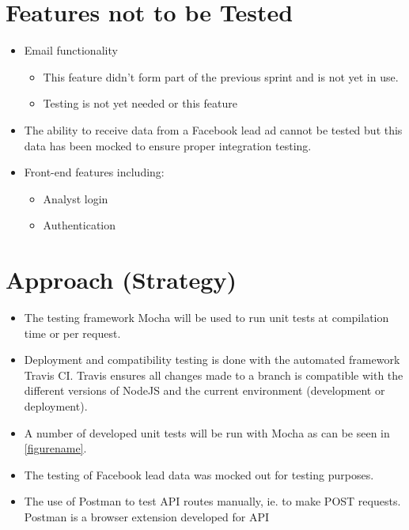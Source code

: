 \documentclass{article}
\begin{document}
\section{Features not to be Tested}
\begin{itemize}
	\item Email functionality
	\begin{itemize}
		\item This feature didn't form part of the previous sprint and is not yet in use.
		\item Testing is not yet needed or this feature
	\end{itemize}
	\item The ability to receive data from a Facebook lead ad cannot be tested but this data has been mocked to ensure proper integration testing.
	\item Front-end features including:
	\begin{itemize}
		\item Analyst login
		\item Authentication
	\end{itemize}
\end{itemize}

\section{Approach (Strategy)}
\begin{itemize}
	\item The testing framework Mocha will be used to run unit tests at compilation time or per request.
	\item Deployment and compatibility testing is done with the automated framework Travis CI. Travis ensures all changes made to a branch is compatible with the different versions of NodeJS and the current environment (development or deployment).
	\item A number of developed unit tests will be run with Mocha as can be seen in \ref{figurename}.
	\item The testing of Facebook lead data was mocked out for testing purposes.
	\item The use of Postman to test API routes manually, ie. to make POST requests. Postman is a browser extension developed for API 
\end{itemize}
\end{document}
